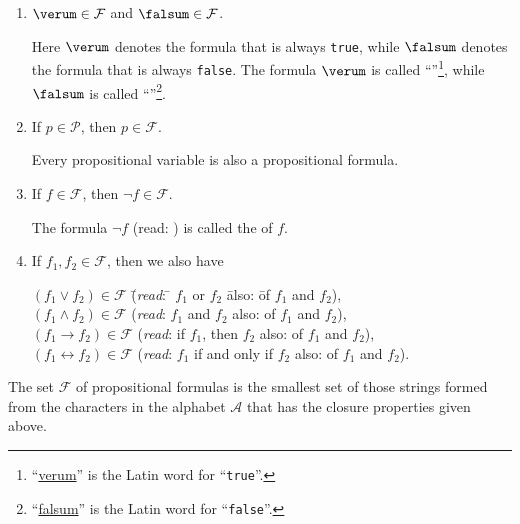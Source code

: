 \begin{enumerate}
\item $\verum \in \mathcal{F}$ and $\falsum \in \mathcal{F}$.

      Here $\verum$   denotes the formula that is always \texttt{true}, while $\falsum$
        denotes the formula that is always \texttt{false}.
      The formula $\verum$ is called
      ``''\footnote{``\href{https://translate.google.com/?sl=la&tl=en&text=falsum&op=translate&hl=en}{verum}''
        is the Latin word for ``\texttt{true}''.},  while $\falsum$ is called 
      ``''\footnote{``\href{https://translate.google.com/?sl=la&tl=en&text=falsum&op=translate&hl=en}{falsum}''
        is the Latin word for ``\texttt{false}''.}.  
\item If $p \in \mathcal{P}$, then  $p \in \mathcal{F}$.

      Every propositional variable is also a propositional formula.
\item If $f \in \mathcal{F}$, then  $\neg f \in \mathcal{F}$.

      The formula  $\neg f$  (read: ) is called the  of $f$.
\item If $f_1, f_2 \in \mathcal{F}$, then we also have
      \begin{tabbing}
        $(f_1 \vee f_2) \in \mathcal{F}$  \hspace*{0.5cm} \= (\textsl{read}: \quad \= $f_1$ or $f_2$ \hspace*{2.3cm} \=
         also: \qquad\= of $f_1$ and $f_2$), \\
        $(f_1 \wedge f_2) \in \mathcal{F}$  \> (\textsl{read}: \> $f_1$ and $f_2$ \>
         also: \> of $f_1$ and $f_2$), \\
        $(f_1 \rightarrow f_2) \in \mathcal{F}$  \> (\textsl{read}:       \> if $f_1$, then $f_2$ \>
         also: \> of $f_1$ and $f_2$), \\
        $(f_1 \leftrightarrow f_2) \in \mathcal{F}$  \>
        (\textsl{read}:       \> $f_1$ if and only if $f_2$ \>
        also: \> of $f_1$ and $f_2$).            
      \end{tabbing}
\end{enumerate}
The set  $\mathcal{F}$ of propositional formulas is the smallest set of those strings formed from the characters
in the alphabet $\mathcal{A}$ that has the closure properties given above.

